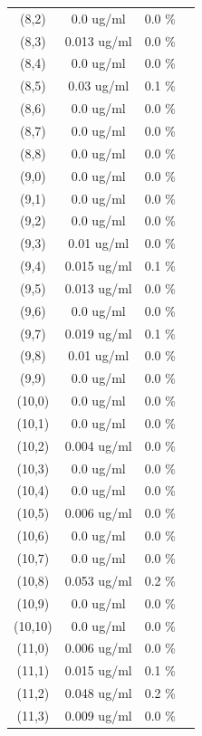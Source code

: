 \documentclass{article}
\begin{document}
\begin{tabular}{c c c c}
(8,2)&        0.0 ug/ml        &0.0 \%\\
(8,3)&        0.013 ug/ml        &0.0 \%\\
(8,4)&        0.0 ug/ml        &0.0 \%\\
(8,5)&        0.03 ug/ml        &0.1 \%\\
(8,6)&        0.0 ug/ml        &0.0 \%\\
(8,7)&        0.0 ug/ml        &0.0 \%\\
(8,8)&        0.0 ug/ml        &0.0 \%\\
(9,0)&        0.0 ug/ml        &0.0 \%\\
(9,1)&        0.0 ug/ml        &0.0 \%\\
(9,2)&        0.0 ug/ml        &0.0 \%\\
(9,3)&        0.01 ug/ml        &0.0 \%\\
(9,4)&        0.015 ug/ml        &0.1 \%\\
(9,5)&        0.013 ug/ml        &0.0 \%\\
(9,6)&        0.0 ug/ml        &0.0 \%\\
(9,7)&        0.019 ug/ml        &0.1 \%\\
(9,8)&        0.01 ug/ml        &0.0 \%\\
(9,9)&        0.0 ug/ml        &0.0 \%\\
(10,0)&        0.0 ug/ml        &0.0 \%\\
(10,1)&        0.0 ug/ml        &0.0 \%\\
(10,2)&        0.004 ug/ml        &0.0 \%\\
(10,3)&        0.0 ug/ml        &0.0 \%\\
(10,4)&        0.0 ug/ml        &0.0 \%\\
(10,5)&        0.006 ug/ml        &0.0 \%\\
(10,6)&        0.0 ug/ml        &0.0 \%\\
(10,7)&        0.0 ug/ml        &0.0 \%\\
(10,8)&        0.053 ug/ml        &0.2 \%\\
(10,9)&        0.0 ug/ml        &0.0 \%\\
(10,10)&        0.0 ug/ml        &0.0 \%\\
(11,0)&        0.006 ug/ml        &0.0 \%\\
(11,1)&        0.015 ug/ml        &0.1 \%\\
(11,2)&        0.048 ug/ml        &0.2 \%\\
(11,3)&        0.009 ug/ml        &0.0 \%\\

\end{tabular}
\end{document}
